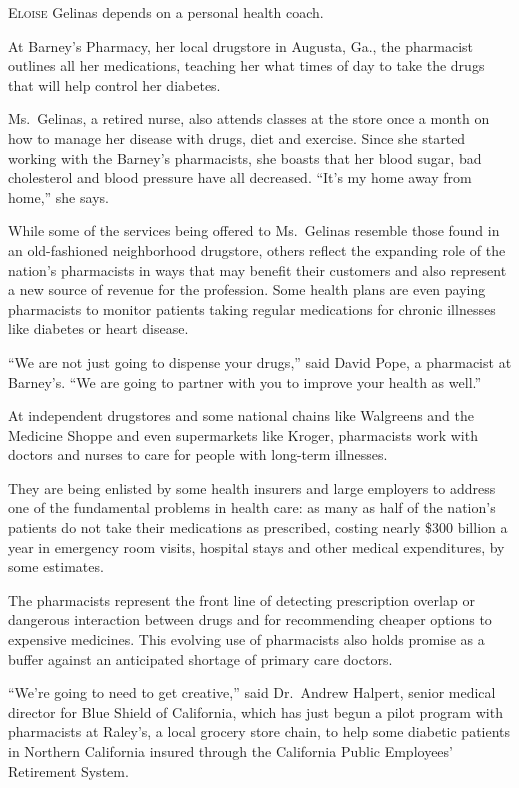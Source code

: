 ﻿\documentclass[12pt]{article}
\begin{document}
\lettrine{E}{loise} Gelinas depends on a personal health coach.

At Barney's Pharmacy, her local drugstore in Augusta, Ga., the pharmacist outlines all her
medications, teaching her what times of day to take the drugs that will help control her diabetes.

Ms.~Gelinas, a retired nurse, also attends classes at the store once a month on how to manage her
disease with drugs, diet and exercise. Since she started working with the Barney's pharmacists, she
boasts that her blood sugar, bad cholesterol and blood pressure have all decreased. ``It's my home
away from home,'' she says.

While some of the services being offered to Ms.~Gelinas resemble those found in an old-fashioned
neighborhood drugstore, others reflect the expanding role of the nation's pharmacists in ways that
may benefit their customers and also represent a new source of revenue for the profession. Some
health plans are even paying pharmacists to monitor patients taking regular medications for chronic
illnesses like diabetes or heart disease.

``We are not just going to dispense your drugs,'' said David Pope, a pharmacist at Barney's. ``We
are going to partner with you to improve your health as well.''

At independent drugstores and some national chains like Walgreens and the Medicine Shoppe and even
supermarkets like Kroger, pharmacists work with doctors and nurses to care for people with long-term
illnesses.

They are being enlisted by some health insurers and large employers to address one of the
fundamental problems in health care: as many as half of the nation's patients do not take their
medications as prescribed, costing nearly \$300 billion a year in emergency room visits, hospital
stays and other medical expenditures, by some estimates.

The pharmacists represent the front line of detecting prescription overlap or dangerous interaction
between drugs and for recommending cheaper options to expensive medicines. This evolving use of
pharmacists also holds promise as a buffer against an anticipated shortage of primary care doctors.

``We're going to need to get creative,'' said Dr.~Andrew Halpert, senior medical director for Blue
Shield of California, which has just begun a pilot program with pharmacists at Raley's, a local
grocery store chain, to help some diabetic patients in Northern California insured through the
California Public Employees' Retirement System.
\end{document}
